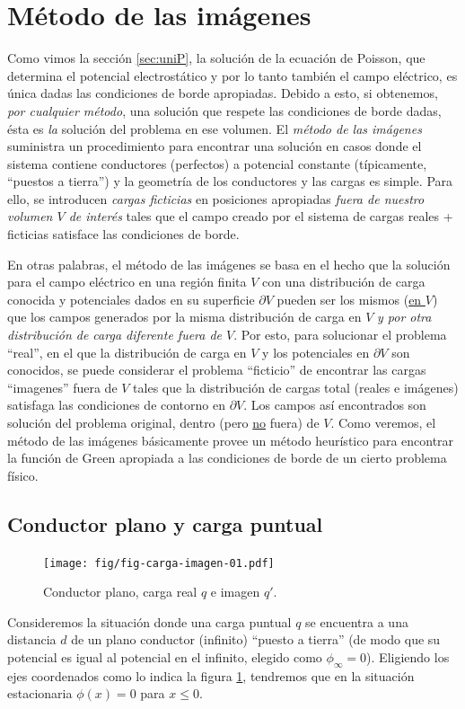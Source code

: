 \section{Método de las imágenes}
Como vimos la sección \ref{sec:uniP}, la solución de la ecuación de Poisson, que determina el potencial electrostático y por lo tanto también el campo eléctrico, es única dadas las condiciones de borde apropiadas. Debido a esto, si
obtenemos, \textit{por cualquier método}, una solución que respete las condiciones de
borde dadas, ésta es \textit{la} solución del problema en ese volumen. El \textit{método de
las imágenes} suministra un procedimiento para encontrar una solución en
casos donde el sistema contiene conductores (perfectos) a potencial constante
(típicamente, ``puestos a tierra'') y la geometría de los conductores y las
cargas es simple. Para ello, se introducen \textit{cargas ficticias} en
posiciones apropiadas \textit{fuera de nuestro volumen $V$ de interés} tales que el campo creado por el sistema de cargas reales
+ ficticias satisface las condiciones de borde.

En otras palabras, el método de las imágenes se basa en el hecho que la
solución para el campo eléctrico en una región finita $V$ con una
distribución de carga conocida y potenciales dados en su superficie
$\partial V$ pueden ser los mismos (\underline{en $V$}) que los campos generados por la
misma distribución de carga en $V$ \textit{y por otra distribución de carga
diferente fuera de $V$}. Por esto, para solucionar el problema ``real'', en el
que la distribución de carga en $V$ y los potenciales en $\partial V$ son conocidos, se
puede considerar el problema ``ficticio'' de encontrar las cargas ``imagenes''
fuera de $V$ tales que la distribución de cargas total (reales e imágenes)
satisfaga las condiciones de contorno en $\partial V$. Los campos así encontrados son
solución del problema original, dentro (pero \underline{no} fuera) de $V$. Como veremos, el método de las imágenes básicamente provee un método heurístico para encontrar la función de Green apropiada a las condiciones de borde de un cierto problema físico.



\subsection{Conductor plano y carga puntual}
\begin{figure}[!h]
\centerline{\texttt{[image: fig/fig-carga-imagen-01.pdf]}}
\caption{Conductor plano, carga real $q$ e imagen $q'$.}
\label{ci01}
\end{figure}
Consideremos la situación donde una carga puntual $q$ se encuentra a una distancia $d$ de un plano conductor (infinito) ``puesto a tierra'' (de modo que su potencial es igual al potencial en el infinito, elegido como $\phi_\infty=0$). Eligiendo los ejes coordenados como lo indica la figura \ref{ci01}, tendremos que en la situación estacionaria $\phi(x)=0$ para $x\le 0$. 

